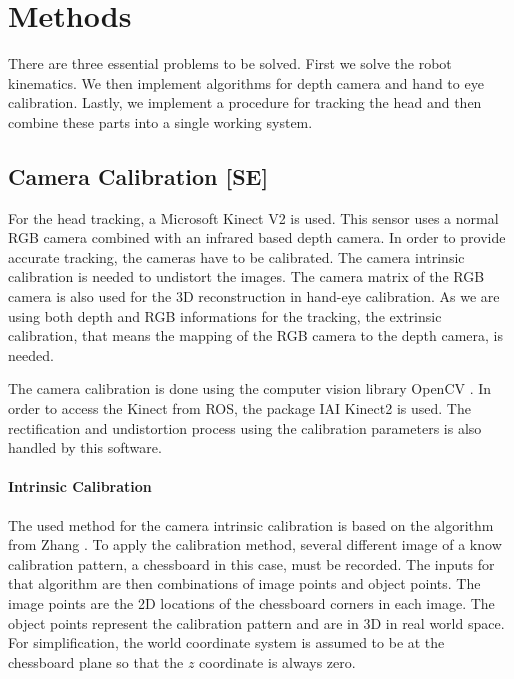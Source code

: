 
\section{Methods}

There are three essential problems to be solved. First we solve the robot kinematics. We then implement algorithms for depth camera and hand to eye calibration. Lastly, we implement a procedure for tracking the head and then combine these parts into a single working system.



\subsection{Camera Calibration [SE]}

For the head tracking, a Microsoft Kinect V2 is used. This sensor uses a normal RGB camera combined with an infrared based depth camera. In order to provide accurate tracking, the cameras have to be calibrated. The camera intrinsic calibration is needed to undistort the images. The camera matrix of the RGB camera is also used for the 3D reconstruction in hand-eye calibration. 
As we are using both depth and RGB informations for the tracking, the extrinsic calibration, that means the mapping of the RGB camera to the depth camera, is needed. 

The camera calibration is done using the computer vision library OpenCV \cite{opencv_library}. In order to access the Kinect from ROS, the package IAI Kinect2 \cite{iai_kinect2} is used. The rectification and undistortion process using the calibration parameters is also handled by this software.

\paragraph{Intrinsic Calibration}

The used method for the camera intrinsic calibration is based on the algorithm from Zhang \cite{Zhang}. 
To apply the calibration method, several different image of a know calibration pattern, a chessboard in this case, must be recorded. 
The inputs for that algorithm are then combinations of image points and object points. The image points are the 2D locations of the chessboard corners in each image. The object points represent the calibration pattern and are in 3D in real world space. For simplification, the world coordinate system is assumed to be at the chessboard plane so that the $z$ coordinate is always zero. 

